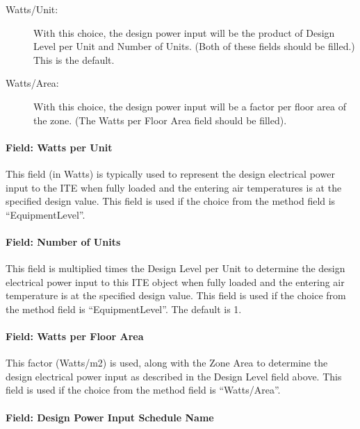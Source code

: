 \begin{description}
	\item[Watts/Unit:] With this choice, the design power input will be the product of Design Level per Unit and Number of Units. (Both of these fields should be filled.) This is the default.

	\item[Watts/Area:] With this choice, the design power input will be a factor per floor area of the zone. (The Watts per Floor Area field should be filled).
\end{description}

\paragraph{Field: Watts per Unit}\label{field-watts-per-unit}

This field (in Watts) is typically used to represent the design electrical power input to the ITE when fully loaded and the entering air temperatures is at the specified design value. This field is used if the choice from the method field is ``EquipmentLevel''.

\paragraph{Field: Number of Units}\label{field-number-of-units}

This field is multiplied times the Design Level per Unit to determine the design electrical power input to this ITE object when fully loaded and the entering air temperature is at the specified design value. This field is used if the choice from the method field is ``EquipmentLevel''. The default is 1.

\paragraph{Field: Watts per Floor Area}\label{field-watts-per-zone-floor-area-2}

This factor (Watts/m2) is used, along with the Zone Area to determine the design electrical power input as described in the Design Level field above. This field is used if the choice from the method field is ``Watts/Area''.

\paragraph{Field: Design Power Input Schedule Name}\label{field-design-power-input-schedule-name}


